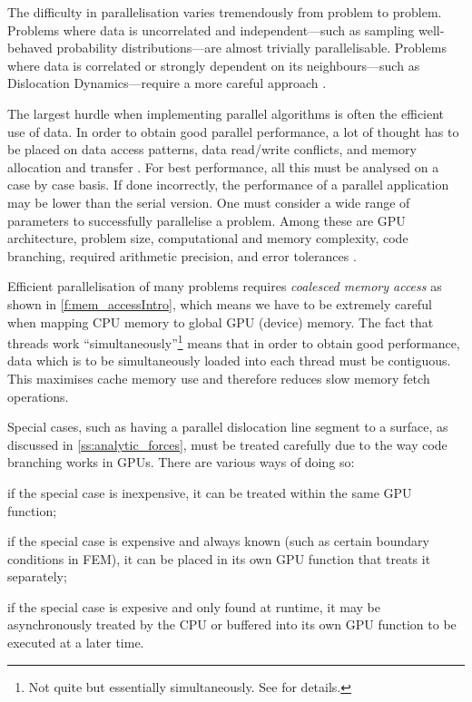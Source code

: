 The difficulty in parallelisation varies tremendously from problem to problem. Problems where data is uncorrelated and independent---such as sampling well-behaved probability distributions---are almost trivially parallelisable. Problems where data is correlated or strongly dependent on its neighbours---such as Dislocation Dynamics---require a more careful approach \cite{parallel_algs}.

The largest hurdle when implementing parallel algorithms is often the efficient use of data. In order to obtain good parallel performance, a lot of thought has to be placed on data access patterns, data read/write conflicts, and memory allocation and transfer \cite{nvidia}. For best performance, all this must be analysed on a case by case basis. If done incorrectly, the performance of a parallel application may be lower than the serial version. One must consider a wide range of parameters to successfully parallelise a problem. Among these are GPU architecture, problem size, computational and memory complexity, code branching, required arithmetic precision, and error tolerances \cite{nvidia, gpu_rev}.

Efficient parallelisation of many problems requires \emph{coalesced memory access} as shown in \cref{f:mem_accessIntro}, which means we have to be extremely careful when mapping CPU memory to global GPU (device) memory. The fact that threads work ``simultaneously''\footnote{Not quite but essentially simultaneously. See \cite{nvidia} for details.} means that in order to obtain good performance, data which is to be simultaneously loaded into each thread must be contiguous. This maximises cache memory use and therefore reduces slow memory fetch operations.

Special cases, such as having a parallel dislocation line segment to a surface, as discussed in \cref{ss:analytic_forces}, must be treated carefully due to the way code branching works in GPUs. There are various ways of doing so:
\begin{inparaenum}[\itshape 1\upshape)]
    \item if the special case is inexpensive, it can be treated within the same GPU function;
    \item if the special case is expensive and always known (such as certain boundary conditions in FEM), it can be placed in its own GPU function that treats it separately;
    \item if the special case is expesive and only found at runtime, it may be asynchronously treated by the CPU or buffered into its own GPU function to be executed at a later time.
\end{inparaenum}

